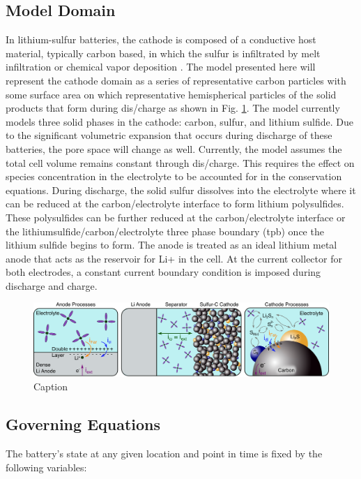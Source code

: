\documentclass{elsarticle}
\begin{document}
\subsection{Model Domain}

In lithium-sulfur batteries, the cathode is composed of a conductive host material, typically carbon based, in which the sulfur is infiltrated by melt infiltration or chemical vapor deposition \cite{BRUCKNER201482}. The model presented here will represent the cathode domain as a series of representative carbon particles with some surface area on which representative hemispherical particles of the solid products that form during dis/charge as shown in Fig. \ref{fig:modeldomain}. The model currently models three solid phases in the cathode: carbon, sulfur, and lithium sulfide. Due to the significant volumetric expansion that occurs during discharge of these batteries, the pore space will change as well. Currently, the model assumes the total cell volume remains constant through dis/charge. This requires the effect on species concentration in the electrolyte to be accounted for in the conservation equations. During discharge, the solid sulfur dissolves into the electrolyte where it can be reduced at the carbon/electrolyte interface to form lithium polysulfides. These polysulfides can be further reduced at the carbon/electrolyte interface or the lithiumsulfide/carbon/electrolyte three phase boundary (tpb) once the lithium sulfide begins to form. The anode is treated as an ideal lithium metal anode that acts as the reservoir for Li+ in the cell. At the current collector for both electrodes, a constant current boundary condition is imposed during discharge and charge. 

\begin{center}
\begin{figure}
    \centering
    \includegraphics[width=\textwidth]{Figure1_Simulation_Domain.png}
    \caption{Caption}
    \label{fig:modeldomain}
\end{figure}
\end{center}

\subsection{Governing Equations}
The battery’s state at any given location and point in time is fixed by the following variables:
\end{document}
